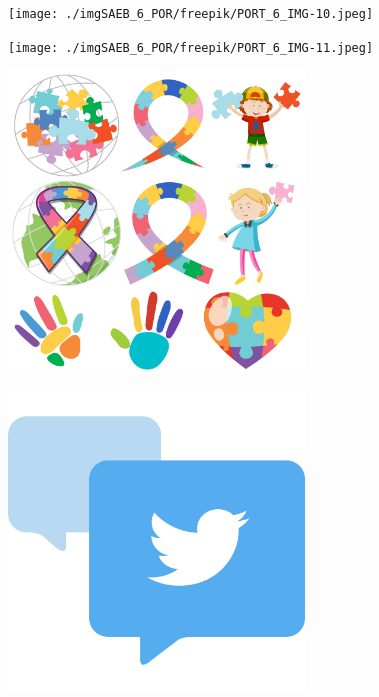 \begin{figure}
\texttt{[image: ./imgSAEB\_6\_POR/freepik/PORT\_6\_IMG-10.jpeg]}
\end{figure}

\begin{figure}
\texttt{[image: ./imgSAEB\_6\_POR/freepik/PORT\_6\_IMG-11.jpeg]}
\end{figure}

\begin{figure}
\includegraphics[width=0.7\textwidth]{./imgSAEB_6_POR/freepik/PORT_6_IMG-12.jpeg}
\end{figure}

\begin{figure}
\includegraphics[width=0.7\textwidth]{./imgSAEB_6_POR/freepik/PORT_6_IMG-13.jpeg}
\end{figure}

